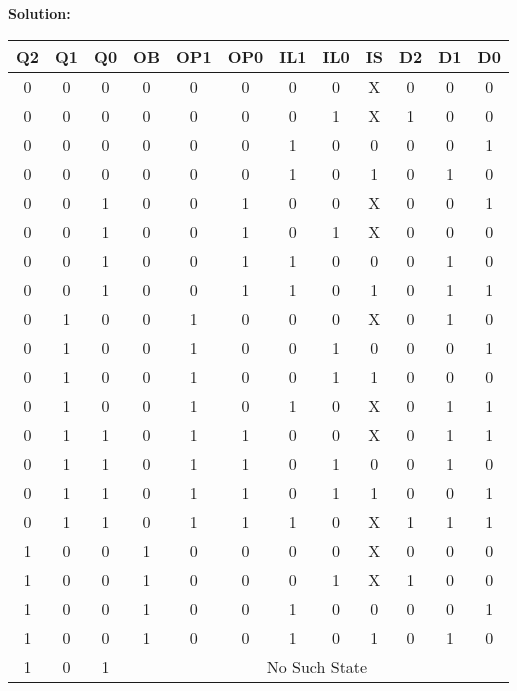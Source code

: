 \textbf{Solution:}

\begin{table}[H]
    \centering
    \begin{tabular}{|c|c|c|c|c|c|c|c|c|c|c|c|}
        \hline
        \textbf{Q2} & \textbf{Q1} & \textbf{Q0} & \textbf{OB} & \textbf{OP1} & \textbf{OP0} & \textbf{IL1} & \textbf{IL0} & \textbf{IS} & \textbf{D2} & \textbf{D1} & \textbf{D0} \\
        \hline
        0 & 0 & 0 & 0 & 0 & 0 & 0 & 0 & X & 0 & 0 & 0 \\ \hline
        0 & 0 & 0 & 0 & 0 & 0 & 0 & 1 & X & 1 & 0 & 0 \\ \hline
        0 & 0 & 0 & 0 & 0 & 0 & 1 & 0 & 0 & 0 & 0 & 1 \\ \hline
        0 & 0 & 0 & 0 & 0 & 0 & 1 & 0 & 1 & 0 & 1 & 0 \\ \hline
        0 & 0 & 1 & 0 & 0 & 1 & 0 & 0 & X & 0 & 0 & 1 \\ \hline
        0 & 0 & 1 & 0 & 0 & 1 & 0 & 1 & X & 0 & 0 & 0 \\ \hline
        0 & 0 & 1 & 0 & 0 & 1 & 1 & 0 & 0 & 0 & 1 & 0 \\ \hline
        0 & 0 & 1 & 0 & 0 & 1 & 1 & 0 & 1 & 0 & 1 & 1 \\ \hline
        0 & 1 & 0 & 0 & 1 & 0 & 0 & 0 & X & 0 & 1 & 0 \\ \hline
        0 & 1 & 0 & 0 & 1 & 0 & 0 & 1 & 0 & 0 & 0 & 1 \\ \hline
        0 & 1 & 0 & 0 & 1 & 0 & 0 & 1 & 1 & 0 & 0 & 0 \\ \hline
        0 & 1 & 0 & 0 & 1 & 0 & 1 & 0 & X & 0 & 1 & 1 \\ \hline
        0 & 1 & 1 & 0 & 1 & 1 & 0 & 0 & X & 0 & 1 & 1 \\ \hline
        0 & 1 & 1 & 0 & 1 & 1 & 0 & 1 & 0 & 0 & 1 & 0 \\ \hline
        0 & 1 & 1 & 0 & 1 & 1 & 0 & 1 & 1 & 0 & 0 & 1 \\ \hline
        0 & 1 & 1 & 0 & 1 & 1 & 1 & 0 & X & 1 & 1 & 1 \\ \hline
        1 & 0 & 0 & 1 & 0 & 0 & 0 & 0 & X & 0 & 0 & 0 \\ \hline
        1 & 0 & 0 & 1 & 0 & 0 & 0 & 1 & X & 1 & 0 & 0 \\ \hline
        1 & 0 & 0 & 1 & 0 & 0 & 1 & 0 & 0 & 0 & 0 & 1 \\ \hline
        1 & 0 & 0 & 1 & 0 & 0 & 1 & 0 & 1 & 0 & 1 & 0 \\ \hline
        1 & 0 & 1 & \multicolumn{9}{c|}{No Such State} \\ \hline

\end{tabular}
\end{table}
